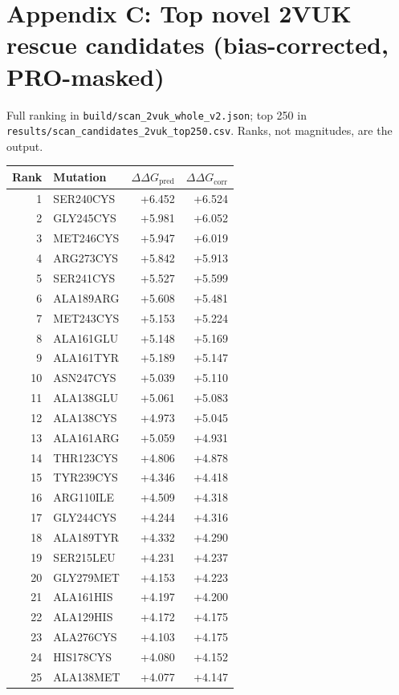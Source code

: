 \section*{Appendix C: Top novel 2VUK rescue candidates (bias-corrected, PRO-masked)}
Full ranking in \texttt{build/scan\_2vuk\_whole\_v2.json}; top 250 in
\texttt{results/scan\_candidates\_2vuk\_top250.csv}. Ranks, not
magnitudes, are the output.
\begin{longtable}{r l r r}
\hline
Rank & Mutation & $\Delta\Delta G_{\mathrm{pred}}$ & $\Delta\Delta G_{\mathrm{corr}}$ \\ \hline
\endhead
1 & SER240CYS & +6.452 & +6.524 \\
2 & GLY245CYS & +5.981 & +6.052 \\
3 & MET246CYS & +5.947 & +6.019 \\
4 & ARG273CYS & +5.842 & +5.913 \\
5 & SER241CYS & +5.527 & +5.599 \\
6 & ALA189ARG & +5.608 & +5.481 \\
7 & MET243CYS & +5.153 & +5.224 \\
8 & ALA161GLU & +5.148 & +5.169 \\
9 & ALA161TYR & +5.189 & +5.147 \\
10 & ASN247CYS & +5.039 & +5.110 \\
11 & ALA138GLU & +5.061 & +5.083 \\
12 & ALA138CYS & +4.973 & +5.045 \\
13 & ALA161ARG & +5.059 & +4.931 \\
14 & THR123CYS & +4.806 & +4.878 \\
15 & TYR239CYS & +4.346 & +4.418 \\
16 & ARG110ILE & +4.509 & +4.318 \\
17 & GLY244CYS & +4.244 & +4.316 \\
18 & ALA189TYR & +4.332 & +4.290 \\
19 & SER215LEU & +4.231 & +4.237 \\
20 & GLY279MET & +4.153 & +4.223 \\
21 & ALA161HIS & +4.197 & +4.200 \\
22 & ALA129HIS & +4.172 & +4.175 \\
23 & ALA276CYS & +4.103 & +4.175 \\
24 & HIS178CYS & +4.080 & +4.152 \\
25 & ALA138MET & +4.077 & +4.147 \\
\hline
\end{longtable}
